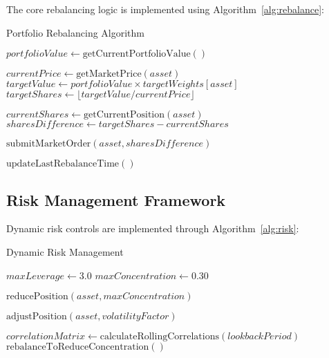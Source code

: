 \documentclass[onecolumn,ieee]{arithmaxresearch}
\begin{document}
The core rebalancing logic is implemented using Algorithm~\ref{alg:rebalance}:

\begin{algorithm}[h]
\caption{Portfolio Rebalancing Algorithm}
\label{alg:rebalance}
\begin{algorithmic}[1]
        \State \Return {}
    \EndIf
    
    \State $portfolioValue \gets \text{getCurrentPortfolioValue}()$
    
        \State $currentPrice \gets \text{getMarketPrice}(asset)$
        \State $targetValue \gets portfolioValue \times targetWeights[asset]$
        \State $targetShares \gets \lfloor targetValue / currentPrice \rfloor$
        
        \State $currentShares \gets \text{getCurrentPosition}(asset)$
        \State $sharesDifference \gets targetShares - currentShares$
        
            \State $\text{submitMarketOrder}(asset, sharesDifference)$
        \EndIf
    \EndFor
    
    \State $\text{updateLastRebalanceTime}()$
\EndFunction
\end{algorithmic}
\end{algorithm}

\subsection{Risk Management Framework}

Dynamic risk controls are implemented through Algorithm~\ref{alg:risk}:

\begin{algorithm}[h]
\caption{Dynamic Risk Management}
\label{alg:risk}
\begin{algorithmic}[1]
    \State $maxLeverage \gets 3.0$
    \State $maxConcentration \gets 0.30$
    
            \State $\text{reducePosition}(asset, maxConcentration)$
        \EndIf
        
            \State $\text{adjustPosition}(asset, volatilityFactor)$
        \EndIf
    \EndFor
    
    \State $correlationMatrix \gets \text{calculateRollingCorrelations}(lookbackPeriod)$
        \State $\text{rebalanceToReduceConcentration}()$
    \EndIf
\EndFunction
\end{algorithmic}
\end{algorithm}
\end{document}
